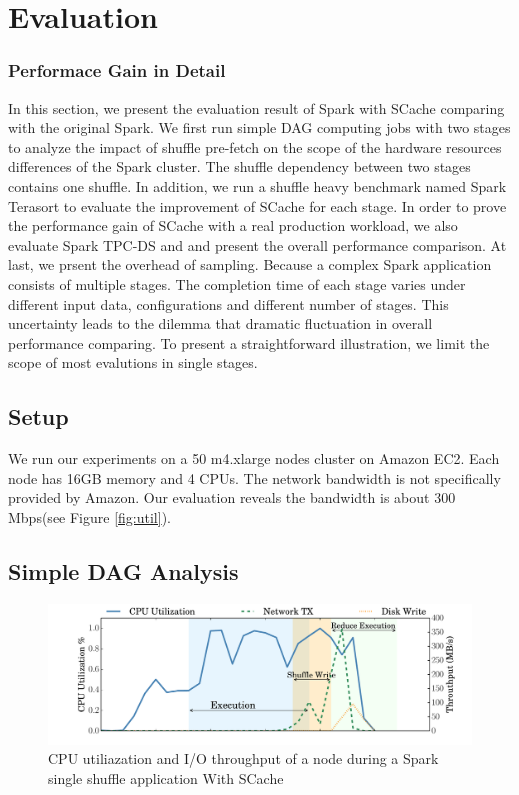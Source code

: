 \section{Evaluation}\label{evaluation}

\subsubsection{Performace Gain in Detail}
In this section, we present the evaluation result of Spark with SCache comparing with the original Spark. We first run simple DAG computing jobs with two stages to analyze the impact of shuffle pre-fetch on the scope of the hardware resources differences of the Spark cluster. The shuffle dependency between two stages contains one shuffle. In addition, we run a shuffle heavy benchmark named Spark Terasort\cite{spark-tera} to evaluate the improvement of SCache for each stage. In order to prove the performance gain of SCache with a real production workload, we also evaluate Spark TPC-DS\cite{sparktpcds} and and present the overall performance comparison. At last, we prsent the overhead of sampling. Because a complex Spark application consists of multiple stages. The completion time of each stage varies under different input data, configurations and different number of stages. This uncertainty leads to the dilemma that dramatic fluctuation in overall performance comparing. To present a straightforward illustration, we limit the scope of most evalutions in single stages. 

\subsection{Setup}\label{stepup}
We run our experiments on a 50 m4.xlarge nodes cluster on Amazon EC2\cite{aws}. Each node has 16GB memory and 4 CPUs. The network bandwidth is not specifically provided by Amazon. Our evaluation reveals the bandwidth is about 300 Mbps(see Figure \ref{fig:util}).

\subsection{Simple DAG Analysis}
\begin{figure}
	\includegraphics[width=\linewidth]{fig/scache_util}
	\caption{CPU utiliazation and I/O throughput of a node during a Spark single shuffle application With SCache}
	\label{fig:scache_util}
\end{figure}

